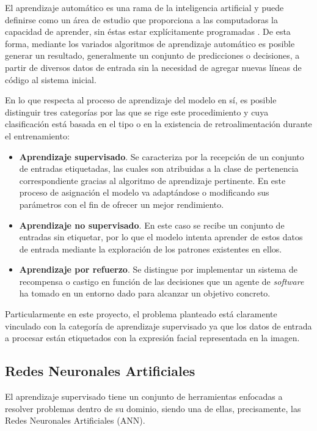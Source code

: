 El aprendizaje automático es una rama de la inteligencia artificial y puede definirse como un área de estudio que proporciona a las computadoras la capacidad de aprender, sin éstas estar explícitamente programadas \cite{MachineLearning}. De esta forma, mediante los variados algoritmos de aprendizaje automático es posible generar un resultado, generalmente un conjunto de predicciones o decisiones, a partir de diversos datos de entrada sin la necesidad de agregar nuevas líneas de código al sistema inicial.

En lo que respecta al proceso de aprendizaje del modelo en sí, es posible distinguir tres categorías por las que se rige este procedimiento y cuya clasificación está basada en el tipo o en la existencia de retroalimentación durante el entrenamiento:
\begin{itemize}
  \item \textbf{Aprendizaje supervisado}. Se caracteriza por la recepción de un conjunto de entradas etiquetadas, las cuales son atribuidas a la clase de pertenencia correspondiente gracias al algoritmo de aprendizaje pertinente. En este proceso de asignación el modelo va adaptándose o modificando sus parámetros con el fin de ofrecer un mejor rendimiento.
  \item \textbf{Aprendizaje no supervisado}. En este caso se recibe un conjunto de entradas sin etiquetar, por lo que el modelo intenta aprender de estos datos de entrada mediante la exploración de los patrones existentes en ellos.
  \item \textbf{Aprendizaje por refuerzo}. Se distingue por implementar un sistema de recompensa o castigo en función de las decisiones que un agente de \textit{software} ha tomado en un entorno dado para alcanzar un objetivo concreto.
\end{itemize}

Particularmente en este proyecto, el problema planteado está claramente vinculado con la categoría de aprendizaje supervisado ya que los datos de entrada a procesar están etiquetados con la expresión facial representada en la imagen.

\subsection{Redes Neuronales Artificiales} \label{Chapter:ANN}

El aprendizaje supervisado tiene un conjunto de herramientas enfocadas a resolver problemas dentro de su dominio, siendo una de ellas, precisamente, las Redes Neuronales Artificiales (ANN).

